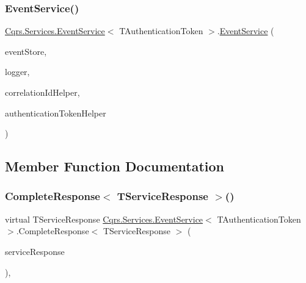 \subsubsection{\texorpdfstring{Event\+Service()}{EventService()}}
{\footnotesize\ttfamily \hyperlink{classCqrs_1_1Services_1_1EventService}{Cqrs.\+Services.\+Event\+Service}$<$ T\+Authentication\+Token $>$.\hyperlink{classCqrs_1_1Services_1_1EventService}{Event\+Service} (\begin{DoxyParamCaption}\item[{\hyperlink{interfaceCqrs_1_1Events_1_1IEventStore}{I\+Event\+Store}$<$ T\+Authentication\+Token $>$}]{event\+Store,  }\item[{I\+Logger}]{logger,  }\item[{I\+Correlation\+Id\+Helper}]{correlation\+Id\+Helper,  }\item[{\hyperlink{interfaceCqrs_1_1Authentication_1_1IAuthenticationTokenHelper}{I\+Authentication\+Token\+Helper}$<$ T\+Authentication\+Token $>$}]{authentication\+Token\+Helper }\end{DoxyParamCaption})\hspace{0.3cm}{\ttfamily [protected]}}



\subsection{Member Function Documentation}
\mbox{\label{classCqrs_1_1Services_1_1EventService_aef315bb1094123bb9b4ab7bd7be9392b_aef315bb1094123bb9b4ab7bd7be9392b}} 
\subsubsection{\texorpdfstring{Complete\+Response$<$ T\+Service\+Response $>$()}{CompleteResponse< TServiceResponse >()}}
{\footnotesize\ttfamily virtual T\+Service\+Response \hyperlink{classCqrs_1_1Services_1_1EventService}{Cqrs.\+Services.\+Event\+Service}$<$ T\+Authentication\+Token $>$.Complete\+Response$<$ T\+Service\+Response $>$ (\begin{DoxyParamCaption}\item[{T\+Service\+Response}]{service\+Response }\end{DoxyParamCaption})\hspace{0.3cm}{\ttfamily [protected]}, {\ttfamily [virtual]}}

